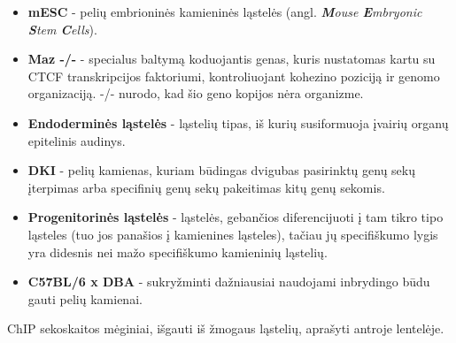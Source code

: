 \documentclass[12pt]{article}
\begin{document}
\begin{itemize}
    \item \textbf{mESC} - pelių embrioninės kamieninės ląstelės
          (angl. \emph{\textbf{M}ouse \textbf{E}mbryonic \textbf{S}tem
          \textbf{C}ells}).
    \item \textbf{Maz -/-} - specialus baltymą koduojantis genas, kuris
          nustatomas kartu su CTCF transk\-rip\-ci\-jos faktoriumi,
          kontroliuojant kohezino poziciją ir genomo organizaciją. -/- nurodo,
          kad šio geno kopijos nėra organizme.
    \item \textbf{Endoderminės ląstelės} - ląstelių tipas, iš kurių 
          susiformuoja įvairių organų epitelinis audinys.
    \item \textbf{DKI} - pelių kamienas, kuriam būdingas dvigubas
          pasirinktų genų sekų įterpimas arba specifinių genų sekų pakeitimas
          kitų genų sekomis.
    \item \textbf{Progenitorinės ląstelės} - ląstelės, gebančios diferencijuoti
          į tam tikro tipo ląsteles (tuo jos panašios į kamienines ląsteles),
          tačiau jų specifiškumo lygis yra didesnis nei mažo specifiškumo
          kamieninių ląstelių.
    \item \textbf{C57BL/6 x DBA} - sukryžminti dažniausiai naudojami inbrydingo
          būdu gauti pelių kamienai.
\end{itemize}

ChIP sekoskaitos mėginiai, išgauti iš žmogaus ląstelių, aprašyti antroje
lentelėje.
\end{document}
